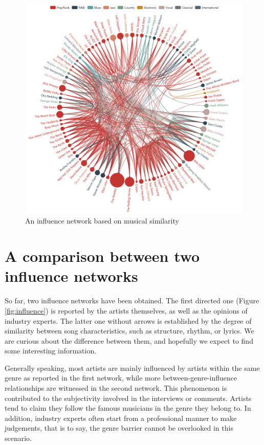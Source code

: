 \begin{figure}
\includegraphics[width=1.25\textwidth]{figures/xdq/similarity.png}
\setlength{\leftskip}{0pt plus 1fil minus \marginparwidth}
\setlength{\rightskip}{\leftskip}
\caption{An influence network based on musical similarity}
\label{fig:similarity}
\end{figure}

\section{A comparison between two influence networks}

So far, two influence networks have been obtained. The first directed one (Figure \ref{fig:influence}) is reported by the artists themselves, as well as the opinions of industry experts. The latter one without arrows is established by the degree of similarity between song characteristics, such as structure, rhythm, or lyrics. We are curious about the difference between them, and hopefully we expect to find some interesting information. 

Generally speaking, most artists are mainly influenced by artists within the same genre as reported in the first network, while more between-genre-influence relationships are witnessed in the second network. This phenomenon is contributed to the subjectivity involved in the interviews or comments. Artists tend to claim they follow the famous musicians in the genre they belong to. In addition, industry experts often start from a professional manner to make judgements, that is to say, the genre barrier cannot be overlooked in this scenario.

